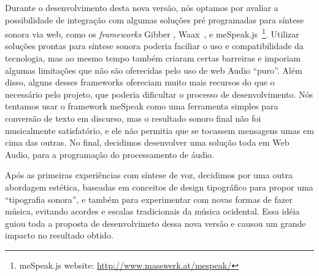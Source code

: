 Durante o desenvolvimento desta nova versão, nós optamos por avaliar a possibilidade de integração com algumas soluções pré programadas para síntese sonora via web, como os \emph{frameworks} Gibber \cite{Roberts2012gibberlivecoding}, Waax~\cite{Choi2013waax}, e meSpeak.js~\footnote{meSpeak.js website: \url{http://www.masswerk.at/mespeak/}}. Utilizar soluções prontas para síntese sonora poderia faciliar o uso e compatibilidade da tecnologia, mas ao mesmo tempo também criaram certas barreiras e imporiam algumas limitações que não são oferecidas pelo uso de web Audio ``puro''. Além disso, alguns desses frameworks ofereciam muito mais recursos do que o necessário pelo projeto, que poderia dificultar o processo de desenvolvimento. Nós tentamos usar o framework meSpeak como uma ferramenta simples para conversão de texto em discurso, mas o resultado sonoro final não foi musicalmente satisfatório, e ele não permitia que se tocassem mensagens umas em cima das outras. No final, decidimos desenvolver uma solução toda em Web Audio, para a programação do processamento de áudio.




Após as primeiras experiências com síntese de voz, decidimos por uma outra abordagem estética, baseadas em conceitos de design tipográfico \cite{ruder_typography:_2009} para propor uma ``tipografia sonora'', e também para experimentar com novas formas de fazer música, evitando acordes e escalas tradicionais da música ocidental. Essa idéia guiou toda a proposta de desenvolvimeto dessa nova versão e causou um grande impacto no resultado obtido.

